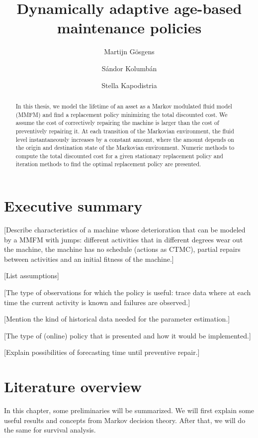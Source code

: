

\title{Dynamically adaptive age-based maintenance policies}
\author{Martijn G\"{o}sgens\\
\and
S\'{a}ndor Kolumb\'{a}n\\
\and
Stella Kapodistria
}



\begin{abstract}
	In this thesis, we model the lifetime of an asset as a Markov modulated fluid model (MMFM) and find a replacement policy minimizing the total discounted cost.
	We assume the cost of correctively repairing the machine is larger than the cost of preventively repairing it.
	At each transition of the Markovian environment, the fluid level instantaneously increases by a constant amount, where the amount depends on the origin and destination state of the Markovian environment.
	Numeric methods to compute the total discounted cost for a given stationary replacement policy and iteration methods to find the optimal replacement policy are presented.
\end{abstract}

\chapter*{Executive summary}
[Describe characteristics of a machine whose deterioration that can be modeled by a MMFM with jumps: different activities that in different degrees wear out the machine, the machine has no schedule (actions as CTMC), partial repairs between activities and an initial fitness of the machine.]

[List assumptions]

[The type of observations for which the policy is useful: trace data where at each time the current activity is known and failures are observed.]

[Mention the kind of historical data needed for the parameter estimation.]

[The type of (online) policy that is presented and how it would be implemented.]

[Explain possibilities of forecasting time until preventive repair.]

\tableofcontents



\chapter{Literature overview}\label{chapter:literatureOverview}
In this chapter, some preliminaries will be summarized.
We will first explain some useful results and concepts from Markov decision theory.
After that, we will do the same for survival analysis.

